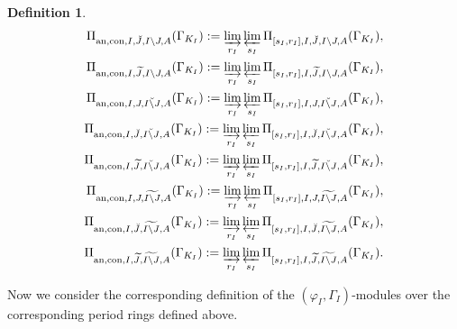 \documentclass[12pt]{amsart}
\theoremstyle{definition}
\newtheorem{definition}[theorem]{Definition}
\numberwithin{equation}{section}
\begin{document}
\begin{definition}
\begin{align}
\Pi_{\mathrm{an},\mathrm{con},I,\breve{J},I\backslash J,A}(\Gamma_{K_I}):=\varinjlim_{r_I}\varprojlim_{s_I}\Pi_{[s_I,r_I],I,\breve{J},I\backslash J,A}(\Gamma_{K_I}),\\	
\Pi_{\mathrm{an},\mathrm{con},I,\widetilde{J},I\backslash J,A}(\Gamma_{K_I}):=\varinjlim_{r_I}\varprojlim_{s_I} \Pi_{[s_I,r_I],I,\widetilde{J},I\backslash J,A}(\Gamma_{K_I}),\\
\Pi_{\mathrm{an},\mathrm{con},I,J,\breve{I\backslash J},A}(\Gamma_{K_I}):=\varinjlim_{r_I}\varprojlim_{s_I}\Pi_{[s_I,r_I],I,J,\breve{I\backslash J},A}(\Gamma_{K_I}),\\	
\Pi_{\mathrm{an},\mathrm{con},I,\breve{J},\breve{I\backslash J},A}(\Gamma_{K_I}):=\varinjlim_{r_I}\varprojlim_{s_I} \Pi_{[s_I,r_I],I,\breve{J},\breve{I\backslash J},A}(\Gamma_{K_I}),\\
\Pi_{\mathrm{an},\mathrm{con},I,\widetilde{J},\breve{I\backslash J},A}(\Gamma_{K_I}):=\varinjlim_{r_I}\varprojlim_{s_I} \Pi_{[s_I,r_I],I,\widetilde{J},\breve{I\backslash J},A}(\Gamma_{K_I}),\\
\Pi_{\mathrm{an},\mathrm{con},I,J,\widetilde{I\backslash J},A}(\Gamma_{K_I}):=\varinjlim_{r_I}\varprojlim_{s_I} \Pi_{[s_I,r_I],I,J,\widetilde{I\backslash J},A}(\Gamma_{K_I}),\\	
\Pi_{\mathrm{an},\mathrm{con},I,\breve{J},\widetilde{I\backslash J},A}(\Gamma_{K_I}):=\varinjlim_{r_I}\varprojlim_{s_I} \Pi_{[s_I,r_I],I,\breve{J},\widetilde{I\backslash J},A}(\Gamma_{K_I}),\\	
\Pi_{\mathrm{an},\mathrm{con},I,\widetilde{J},\widetilde{I\backslash J},A}(\Gamma_{K_I}):=\varinjlim_{r_I}\varprojlim_{s_I} \Pi_{[s_I,r_I],I,\widetilde{J},\widetilde{I\backslash J},A}(\Gamma_{K_I}).	
\end{align}	
\end{definition}


\indent Now we consider the corresponding definition of the $(\varphi_I,\Gamma_I)$-modules over the corresponding period rings  defined above. 
\end{document}
